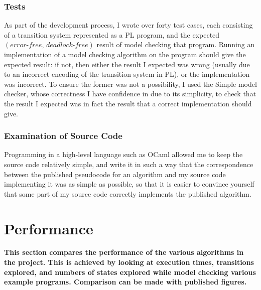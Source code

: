 \documentclass[12pt,a4paper,twoside,openright]{report}
\begin{document}
\subsubsection{Tests}
\label{sec:pl-checker-tests}
As part of the development process,
I wrote over forty test cases, each 
consisting of a transition system
represented as a PL program, and
the expected
$(\textit{error-free},\, \textit{deadlock-free})$
result of model checking that program.
Running an implementation of a model
checking algorithm on the program should
give the expected result: if not, then
either the result I expected was wrong
(usually due to an incorrect encoding
of the transition system in PL),
or the implementation was incorrect.
To ensure the former was not a possibility,
I used the Simple model checker, whose
correctness I have confidence in due
to its simplicity, to check that the
result I expected was in fact the
result that a correct implementation
should give.

\subsubsection{Examination of Source Code}
Programming in a high-level language such as
OCaml allowed me to keep the source code
relatively simple, and write it in such
a way that the correspondence between
the published pseudocode for an algorithm
and my source code implementing it was
as simple as possible, so that it
is easier to convince yourself that
some part of my source code correctly
implements the published algorithm.

\section{Performance}
\textbf{This section compares the
	performance of the various algorithms
	in the project. This is achieved by
	looking at execution times, transitions
	explored, and numbers of states explored
	while model checking various example
	programs. Comparison can be made with
	published figures.}
\end{document}

